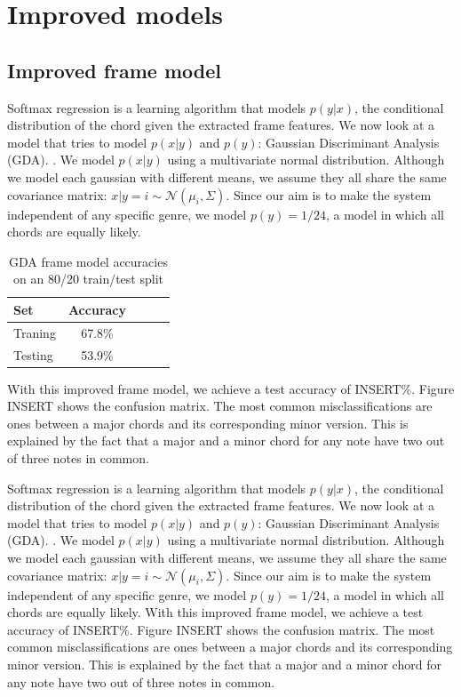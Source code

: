 \documentclass{article}
\begin{document}
\section{Improved models}
\subsection{Improved frame model}

Softmax regression is a learning algorithm that models $p(y|x)$, the conditional
distribution of the chord given the extracted frame features. We now look at a
model that tries to model $p(x|y)$ and $p(y)$: Gaussian Discriminant Analysis
(GDA). \cite{jiang}. We model $p(x|y)$ using a multivariate normal distribution.
Although we model each gaussian with different means, we assume they all share
the same covariance matrix: $x|y=i \sim \mathcal{N}$$(\mu_i, \Sigma)$. Since our
aim is to make the system independent of any specific genre, we model $p(y) =
1/24$, a model in which all chords are equally likely.

\begin{table}[t]
\caption{GDA frame model accuracies on an 80/20 train/test split}
\label{mfccvschroma}
\vskip 0.15in
\begin{center}
\begin{small}
\begin{sc}
\begin{tabular}{lcccr}
\hline
\abovespace\belowspace
Set & Accuracy \\
\hline
\abovespace
Traning & 67.8\%\\
Testing & 53.9\%\\
\hline
\end{tabular}
\end{sc}
\end{small}
\end{center}
\vskip -0.1in
\end{table}

With this improved frame model, we achieve a test accuracy of INSERT\%. Figure
INSERT shows the confusion matrix. The most common misclassifications are ones
between a major chords and its corresponding minor version. This is explained by
the fact that a major and a minor chord for any note have two out of three notes
in common.

Softmax regression is a learning algorithm that models $p(y|x)$, the conditional
distribution of the chord given the extracted frame features. We now look at a
model that tries to model $p(x|y)$ and $p(y)$: Gaussian Discriminant Analysis
(GDA). \cite{jiang}. We model $p(x|y)$ using a multivariate normal distribution.
Although we model each gaussian with different means, we assume they all share
the same covariance matrix: $x|y=i \sim \mathcal{N}$$(\mu_i, \Sigma)$. Since our
aim is to make the system independent of any specific genre, we model $p(y) =
1/24$, a model in which all chords are equally likely. With this improved frame
model, we achieve a test accuracy of INSERT\%. Figure INSERT shows the confusion
matrix. The most common misclassifications are ones between a major chords and
its corresponding minor version. This is explained by the fact that a major and
a minor chord for any note have two out of three notes in common.
\end{document}
